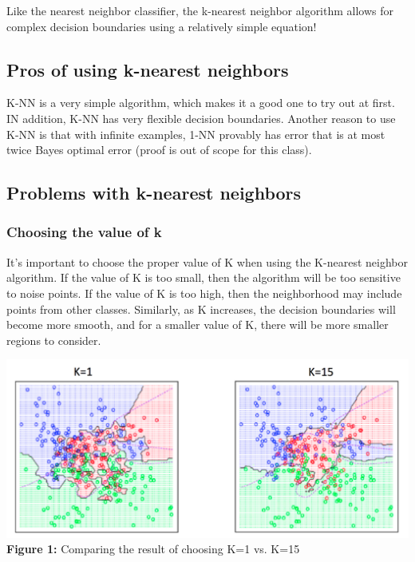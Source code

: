\documentclass{article}
\begin{document}
Like the nearest neighbor classifier, the k-nearest neighbor algorithm allows for complex decision boundaries using a relatively simple equation!

\subsection{Pros of using k-nearest neighbors}
K-NN is a very simple algorithm, which makes it a good one to try out at first. IN addition, K-NN has very flexible decision boundaries. Another reason to use K-NN is that with infinite examples, 1-NN provably has error that is at most twice Bayes optimal error (proof is out of scope for this class).

\subsection{Problems with k-nearest neighbors}


\subsubsection{Choosing the value of k}

It's important to choose the proper value of K when using the K-nearest neighbor algorithm. If the value of K is too small, then the algorithm will be too sensitive to noise points. If the value of K is too high, then the neighborhood may include points from other classes. Similarly, as K increases, the decision boundaries will become more smooth, and for a smaller value of K, there will be more smaller regions to consider.

\begin{center}
	\includegraphics[scale=0.5]{ChoosingValueOfK.png}\\
    \textbf{Figure 1:} Comparing the result of choosing K=1 vs. K=15\\
\end{center}
\end{document}
